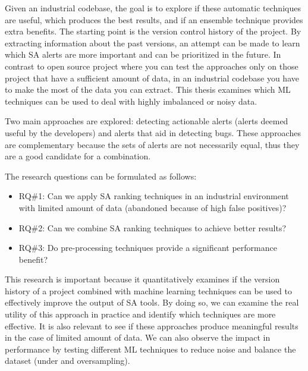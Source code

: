 Given an industrial codebase, the goal is to explore if these automatic techniques are useful, which produces the best results, and if an ensemble technique provides extra benefits. The starting point is the version control history of the project. By extracting information about the past versions, an attempt can be made to learn which SA alerts are more important and can be prioritized in the future. In contrast to open source project where you can test the approaches only on those project that have a sufficient amount of data, in an industrial codebase you have to make the most of the data you can extract. This thesis examines which ML techniques can be used to deal with highly imbalanced or noisy data.


Two main approaches are explored: detecting actionable alerts (alerts deemed useful by the developers) and alerts that aid in detecting bugs. These approaches are complementary because the sets of alerts are not necessarily equal, thus they are a good candidate for a combination.

The research questions can be formulated as follows:
\begin{itemize}
    \item RQ\#1: Can we apply SA ranking techniques in an industrial environment with limited amount of data (abandoned because of high false positives)?
    \item RQ\#2: Can we combine SA ranking techniques to achieve better results?
    \item RQ\#3: Do pre-processing techniques provide a significant performance benefit?
\end{itemize}

This research is important because it quantitatively examines if the version history of a project combined with machine learning techniques can be used to effectively improve the output of SA tools. By doing so, we can examine the real utility of this approach in practice and identify which techniques are more effective. It is also relevant to see if these approaches produce meaningful results in the case of limited amount of data. We can also observe the impact in performance by testing different ML techniques to reduce noise and balance the dataset (under and oversampling). 

